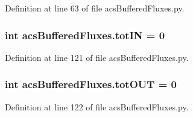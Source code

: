 Definition at line 63 of file acs\-Buffered\-Fluxes.\-py.

\hypertarget{a00092_a59bf56491943c5f1414e0cc407b48b93}{
\subsubsection[{tot\-I\-N}]{\setlength{\rightskip}{0pt plus 5cm}int acs\-Buffered\-Fluxes.\-tot\-I\-N = 0}}\label{a00092_a59bf56491943c5f1414e0cc407b48b93}


Definition at line 121 of file acs\-Buffered\-Fluxes.\-py.

\hypertarget{a00092_a730efee103fd41819ea5848cec249d07}{
\subsubsection[{tot\-O\-U\-T}]{\setlength{\rightskip}{0pt plus 5cm}int acs\-Buffered\-Fluxes.\-tot\-O\-U\-T = 0}}\label{a00092_a730efee103fd41819ea5848cec249d07}


Definition at line 122 of file acs\-Buffered\-Fluxes.\-py.

